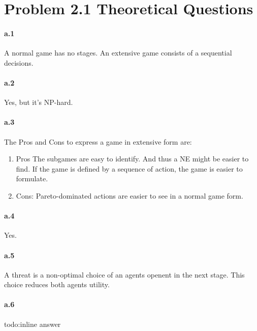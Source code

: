 \section{Problem 2.1 Theoretical Questions}
\label{2.1}

\paragraph{a.1}
A normal game has no stages. An extensive game consists of a sequential decisions.
\paragraph{a.2}
Yes, but it's NP-hard.
\paragraph{a.3}
The Pros and Cons to express a game in extensive form are:
\begin{enumerate}
	\item {Pros} The subgames are easy to identify. And thus a NE might be easier to find. If the game is defined by a sequence of action, the game is easier to formulate.
	\item {Cons:} Pareto-dominated actions are easier to see in a normal game form.
\end{enumerate}
\paragraph{a.4}
Yes. %
\paragraph{a.5}
A threat is a non-optimal choice of an agents openent in the next stage. This choice reduces both agents utility.
\paragraph{a.6}
todo:inline answer
\\
\\

